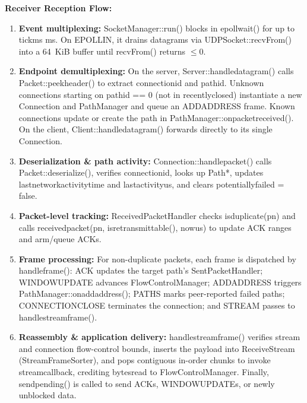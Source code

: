 \documentclass[10pt,a4paper]{article}
\newcommand{\codeul}{\textunderscore\hspace{0pt}}
\DeclareRobustCommand{\code}[1]{{\ttfamily\let\_\codeul #1}}
\begin{document}
\textbf{Receiver Reception Flow:}
\begin{enumerate}
    \item \textbf{Event multiplexing:} \code{SocketManager::run()} blocks in \code{epoll\_wait()} for up to \code{tick\_ms} ms. On \code{EPOLLIN}, it drains datagrams via \code{UDPSocket::recvFrom()} into a 64~KiB buffer until \code{recvFrom()} returns $\le 0$.
    \item \textbf{Endpoint demultiplexing:} On the server, \code{Server::handle\_datagram()} calls \code{Packet::peek\_header()} to extract \code{connection\_id} and \code{path\_id}. Unknown connections starting on \code{path\_id == 0} (not in \code{recently\_closed}) instantiate a new \code{Connection} and \code{PathManager} and queue an \code{ADD\_ADDRESS} frame. Known connections update or create the path in \code{PathManager::on\_packet\_received()}. On the client, \code{Client::handle\_datagram()} forwards directly to its single \code{Connection}.
    \item \textbf{Deserialization \& path activity:} \code{Connection::handle\_packet()} calls \code{Packet::deserialize()}, verifies \code{connection\_id}, looks up \code{Path*}, updates \code{last\_network\_activity\_time} and \code{last\_activity\_us}, and clears \code{potentially\_failed = false}.
    \item \textbf{Packet-level tracking:} \code{ReceivedPacketHandler} checks \code{is\_duplicate(pn)} and calls \code{received\_packet(pn, is\_retransmittable(), now\_us)} to update ACK ranges and arm/queue ACKs.
    \item \textbf{Frame processing:} For non-duplicate packets, each frame is dispatched by \code{handle\_frame()}: \code{ACK} updates the target path's \code{SentPacketHandler}; \code{WINDOW\_UPDATE} advances \code{FlowControlManager}; \code{ADD\_ADDRESS} triggers \code{PathManager::on\_add\_address()}; \code{PATHS} marks peer-reported failed paths; \code{CONNECTION\_CLOSE} terminates the connection; and \code{STREAM} passes to \code{handle\_stream\_frame()}.
    \item \textbf{Reassembly \& application delivery:} \code{handle\_stream\_frame()} verifies stream and connection flow-control bounds, inserts the payload into \code{ReceiveStream} (\code{StreamFrameSorter}), and pops contiguous in-order chunks to invoke \code{stream\_callback}, crediting \code{bytes\_read} to \code{FlowControlManager}. Finally, \code{send\_pending()} is called to send ACKs, \code{WINDOW\_UPDATE}s, or newly unblocked data.
\end{enumerate}
\end{document}
